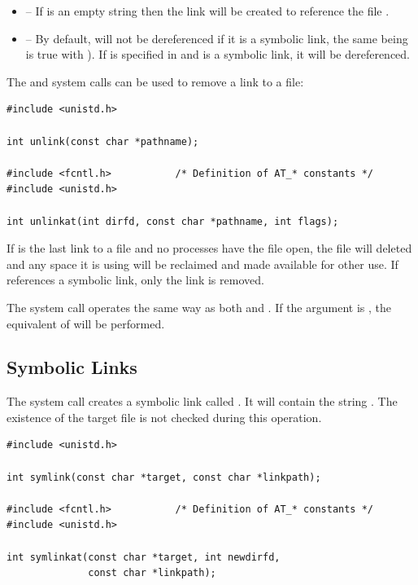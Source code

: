 \begin{itemize}
	\item {} -- If  is an empty string then the link will be created to reference the file
		.
	\item {} -- By default,  will not be dereferenced if it is a symbolic  link, the same
		being is true with ).  If  is specified in  and  is a symbolic 
		link, it will be dereferenced.
\end{itemize}

\noindent
The  and   system calls can be used to remove a link to a file:

\begin{lstlisting}
#include <unistd.h>

int unlink(const char *pathname);

#include <fcntl.h>           /* Definition of AT_* constants */
#include <unistd.h>

int unlinkat(int dirfd, const char *pathname, int flags);
\end{lstlisting}

\noindent
 If  is the last link to a file and no processes have the file open, the file will deleted and any space it is using will be reclaimed and made available for other use. If  references a symbolic link, only the link is removed.
 
 The  system call operates the same way as both  and . If the  argument is , the equivalent of  will be performed.
 
 
 \subsection{Symbolic Links}
 
The  system call creates a symbolic link called . It will contain the string . The existence of the target file is not checked during this operation.
 
\begin{lstlisting}
#include <unistd.h>

int symlink(const char *target, const char *linkpath);

#include <fcntl.h>           /* Definition of AT_* constants */ 
#include <unistd.h>

int symlinkat(const char *target, int newdirfd, 
              const char *linkpath);
\end{lstlisting}

